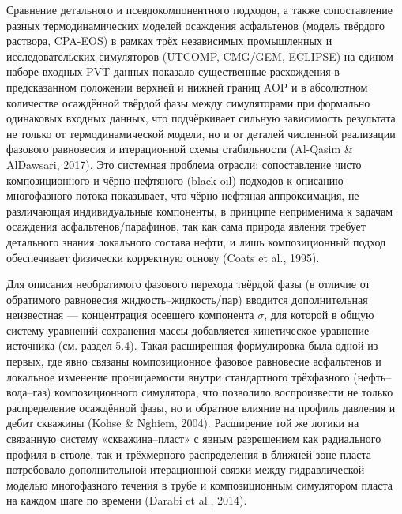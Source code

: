 \documentclass[11pt]{extarticle}
\begin{document}
Сравнение детального и псевдокомпонентного подходов, а также сопоставление разных термодинамических моделей осаждения асфальтенов (модель твёрдого раствора, CPA-EOS) в рамках трёх независимых промышленных и исследовательских симуляторов (UTCOMP, CMG/GEM, ECLIPSE) на едином наборе входных PVT-данных показало существенные расхождения в предсказанном положении верхней и нижней границ AOP и в абсолютном количестве осаждённой твёрдой фазы между симуляторами при формально одинаковых входных данных, что подчёркивает сильную зависимость результата не только от термодинамической модели, но и от деталей численной реализации фазового равновесия и итерационной схемы стабильности (Al-Qasim \& AlDawsari, 2017). Это системная проблема отрасли: сопоставление чисто композиционного и чёрно-нефтяного (black-oil) подходов к описанию многофазного потока показывает, что чёрно-нефтяная аппроксимация, не различающая индивидуальные компоненты, в принципе неприменима к задачам осаждения асфальтенов/парафинов, так как сама природа явления требует детального знания локального состава нефти, и лишь композиционный подход обеспечивает физически корректную основу (Coats et al., 1995).

Для описания необратимого фазового перехода твёрдой фазы (в отличие от обратимого равновесия жидкость--жидкость/пар) вводится дополнительная неизвестная --- концентрация осевшего компонента \(\sigma\), для которой в общую систему уравнений сохранения массы добавляется кинетическое уравнение источника (см. раздел 5.4). Такая расширенная формулировка была одной из первых, где явно связаны композиционное фазовое равновесие асфальтенов и локальное изменение проницаемости внутри стандартного трёхфазного (нефть--вода--газ) композиционного симулятора, что позволило воспроизвести не только распределение осаждённой фазы, но и обратное влияние на профиль давления и дебит скважины (Kohse \& Nghiem, 2004). Расширение той же логики на связанную систему «скважина--пласт» с явным разрешением как радиального профиля в стволе, так и трёхмерного распределения в ближней зоне пласта потребовало дополнительной итерационной связки между гидравлической моделью многофазного течения в трубе и композиционным симулятором пласта на каждом шаге по времени (Darabi et al., 2014).
\end{document}
